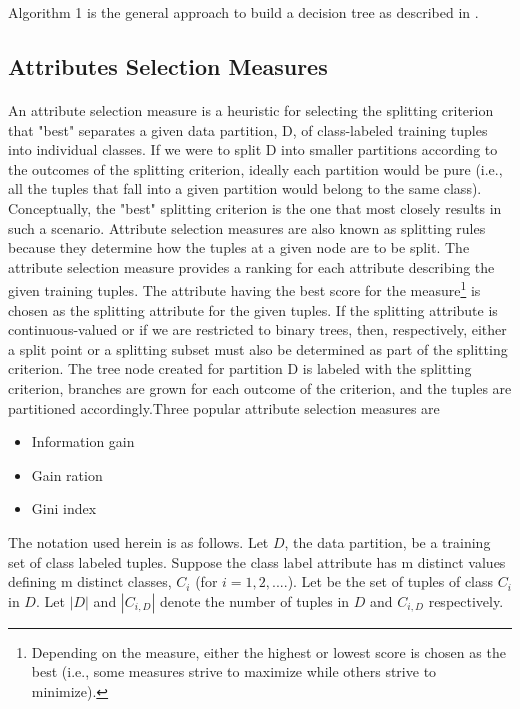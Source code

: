 Algorithm 1 is the general approach to build a decision tree as described in \cite{Data Mining Concepts and Techniques}.

\subsection{Attributes Selection Measures}
\paragraph{}
An attribute selection measure is a heuristic for selecting the splitting criterion that "best" separates a given
data partition, D, of class-labeled training tuples into individual classes. If we were to split D into smaller
partitions according to the outcomes of the splitting criterion, ideally each partition would be pure (i.e., all the
tuples that fall into a given partition would belong to the same class). Conceptually, the "best" splitting
criterion is the one that most closely results in such a scenario. Attribute selection measures are also known as
splitting rules because they determine how the tuples at a given node are to be split. \newline
The attribute selection measure provides a ranking for each attribute describing the given training tuples. The
attribute having the best score for the measure\footnote{\label{third}Depending on the measure, either the highest or lowest score is chosen as the best (i.e., some measures strive to maximize while others strive to minimize).} is chosen as the splitting attribute for the given tuples. If the
splitting attribute is continuous-valued or if we are restricted to binary trees, then, respectively, either a split
point or a splitting subset must also be determined as part of the splitting criterion. The tree node created for
partition D is labeled with the splitting criterion, branches are grown for each outcome of the criterion, and the
tuples are partitioned accordingly.Three popular attribute selection measures are

\begin{itemize}
\item Information gain
\item Gain ration
\item Gini index
\end{itemize}
The notation used herein is as follows. Let $D$, the data partition, be a training set of class labeled tuples.
Suppose the class label attribute has m distinct values defining m distinct classes, $C_i$ (for $i=1,2,....$). Let
be the set of tuples of class $C_i$ in $D$. Let $|D|$ and $|C_{i,D}|$ denote the number of tuples in $D$ and $C_{i,D}$
respectively.
